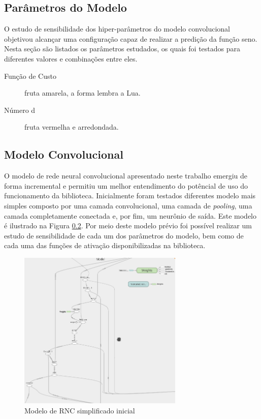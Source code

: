 \documentclass[a4paper,10pt]{report}
\begin{document}
\subsection{Parâmetros do Modelo}
O estudo de sensibilidade dos hiper-parâmetros do modelo convolucional objetivou 
alcançar uma configuração capaz de realizar a predição da função seno.
Nesta seção são listados os parâmetros estudados, os quais foi testados
para diferentes valores e combinações entre eles.

 \begin{description}
   \item[Função de Custo] fruta amarela, a forma lembra a Lua.
   \item[Número d] fruta vermelha e arredondada.
 \end{description}


\subsection{Modelo Convolucional}
O modelo de rede neural convolucional apresentado neste trabalho
emergiu de forma incremental e permitiu um melhor
entendimento do potêncial de uso do funcionamento da biblioteca.
Inicialmente foram testados diferentes modelo mais simples composto
por uma camada convolucional, uma camada de \textit{pooling},
uma camada completamente conectada e, por fim, um neurônio de saída.
Este modelo é ilustrado na Figura \ref{}. Por meio deste modelo
prévio foi possível realizar um estudo de sensibilidade de cada um
dos parâmetros do modelo, bem como de cada uma das funções de
ativação disponibilizadas na biblioteca.

\begin{figure}[htp]
\begin{center}
  \includegraphics[width=0.7\textwidth]{cnn_model}
  \caption{Modelo de RNC simplificado inicial}
  \label{fig:rncSimple}
\end{center}
\end{figure}
\end{document}
